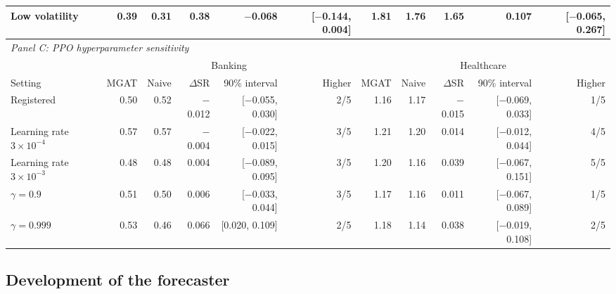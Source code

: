 \documentclass[pdflatex,sn-mathphys-num]{sn-jnl}%
\theoremstyle{thmstyleone}%
\theoremstyle{thmstyletwo}%
\theoremstyle{thmstylethree}%
\begin{document}
\begin{table}[!t]
{\begin{tabular}{lrrrrrrrrrr}
Low volatility & 0.39 & 0.31 & 0.38 & $-$0.068 & [$-$0.144, 0.004] & 1.81 & 1.76 & 1.65 & 0.107 & [$-$0.065, 0.267] \\
\midrule
\multicolumn{11}{l}{\textit{Panel C: PPO hyperparameter sensitivity}} \\
 & \multicolumn{5}{c}{Banking} & \multicolumn{5}{c}{Healthcare} \\ \cmidrule(lr){2-6}\cmidrule(lr){7-11}
Setting & MGAT & Naive & $\Delta$SR & 90\% interval & Higher & MGAT & Naive & $\Delta$SR & 90\% interval & Higher \\ \midrule
Registered & 0.50 & 0.52 & $-$0.012 & [$-$0.055, 0.030] & 2/5 & 1.16 & 1.17 & $-$0.015 & [$-$0.069, 0.033] & 1/5 \\
Learning rate $3\times10^{-4}$ & 0.57 & 0.57 & $-$0.004 & [$-$0.022, 0.015] & 3/5 & 1.21 & 1.20 & 0.014 & [$-$0.012, 0.044] & 4/5 \\
Learning rate $3\times10^{-3}$ & 0.48 & 0.48 & 0.004 & [$-$0.089, 0.095] & 3/5 & 1.20 & 1.16 & 0.039 & [$-$0.067, 0.151] & 5/5 \\
$\gamma=0.9$ & 0.51 & 0.50 & 0.006 & [$-$0.033, 0.044] & 3/5 & 1.17 & 1.16 & 0.011 & [$-$0.067, 0.089] & 1/5 \\
$\gamma=0.999$ & 0.53 & 0.46 & 0.066 & [0.020, 0.109] & 2/5 & 1.18 & 1.14 & 0.038 & [$-$0.019, 0.108] & 2/5 \\
\bottomrule\end{tabular}}
\end{table}


\subsection{Development of the forecaster}\label{subsec:history}
\end{document}
